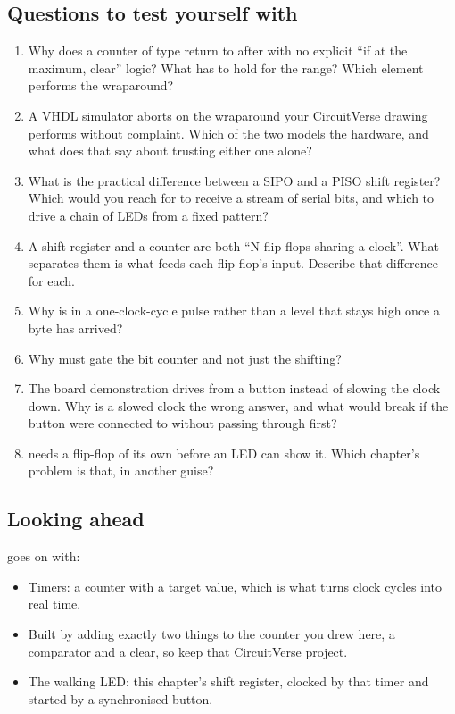 \subsection*{Questions to test yourself with}
\begin{enumerate}
  \item Why does a counter of type  return to  after 
    with no explicit ``if at the maximum, clear'' logic? What has to hold for the range? Which
    element performs the wraparound?
  \item A VHDL simulator aborts on the wraparound your CircuitVerse drawing performs without
    complaint. Which of the two models the hardware, and what does that say about trusting either
    one alone?
  \item What is the practical difference between a SIPO and a PISO shift register? Which would you
    reach for to receive a stream of serial bits, and which to drive a chain of LEDs from a fixed
    pattern?
  \item A shift register and a counter are both ``N flip-flops sharing a clock''. What separates
    them is what feeds each flip-flop's input. Describe that difference for each.
  \item Why is  in  a one-clock-cycle pulse rather than a level
    that stays high once a byte has arrived?
  \item Why must  gate the bit counter and not just the shifting?
  \item The board demonstration drives  from a button instead of slowing the
    clock down. Why is a slowed clock the wrong answer, and what would break if the button were
    connected to  without passing through  first?
  \item {} needs a flip-flop of its own before an LED can show it. Which chapter's
    problem is that, in another guise?
\end{enumerate}

\subsection*{Looking ahead}
 goes on with:
\begin{itemize}
  \item Timers: a counter with a target value, which is what turns clock cycles into real time.
  \item Built by adding exactly two things to the counter you drew here, a comparator and a clear,
    so keep that CircuitVerse project.
  \item The walking LED: this chapter's shift register, clocked by that timer and started by a
    synchronised button.
\end{itemize}
